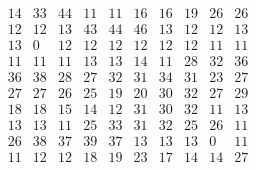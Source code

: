 \documentclass[12pt,oneside,a4paper]{article}
\begin{document}
\begin{equation}
  \tag{Mean Tabu Duration by city table 18}
  \begin{smallmatrix} 14 & 33 & 44 & 11 & 11 & 16 & 16 & 19 & 26 & 26\\
    12 & 12 & 13 & 43 & 44 & 46 & 13 & 12 & 12 & 13 \\
    13 & 0 & 12 & 12& 12 & 12 & 12 & 12& 11 & 11 \\
    11 & 11 & 11 & 13 & 13& 14 & 11 & 28 & 32 & 36 \\
    36 & 38 & 28 & 27 & 32 & 31 & 34 & 31 & 23 & 27 \\
    27 & 27&  26 & 25 & 19 & 20 & 30 & 32& 27 & 29 \\
    18 & 18 & 15 & 14 & 12 & 31&  30 & 32 & 11 & 13 \\
    13& 13 & 11 & 25 & 33 & 31 & 32& 25 & 26 & 11 \\
    26 & 38 & 37 & 39 & 37 & 13 & 13 & 13 & 0 & 11 \\ 
    11 & 12 & 12 & 18 & 19 & 23 & 17 & 14 & 14 & 27 \\
  \end{smallmatrix}
\end{equation}
\end{document}
